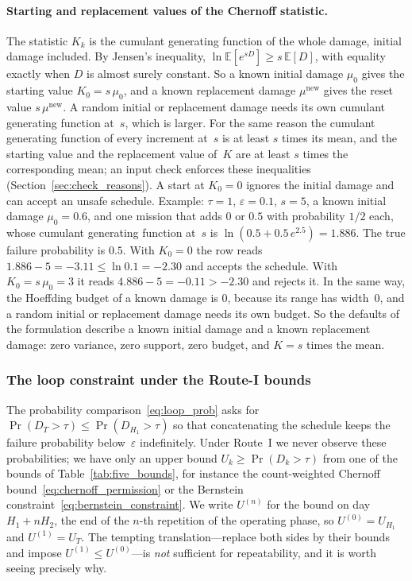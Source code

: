 \documentclass[11pt,a4paper]{article}
\theoremstyle{plain}
\theoremstyle{definition}
\theoremstyle{remark}
\begin{document}
\paragraph{Starting and replacement values of the Chernoff statistic.}
The statistic $K_k$ is the cumulant generating function of the whole damage, initial damage included.
By Jensen's inequality, $\ln\mathbb{E}[e^{sD}] \ge s\,\mathbb{E}[D]$, with equality exactly when $D$ is almost surely constant.
So a known initial damage $\mu_0$ gives the starting value $K_0 = s\,\mu_0$, and a known replacement damage $\mu^{\mathrm{new}}$ gives the reset value $s\,\mu^{\mathrm{new}}$.
A random initial or replacement damage needs its own cumulant generating function at~$s$, which is larger.
For the same reason the cumulant generating function of every increment at~$s$ is at least $s$ times its mean, and the starting value and the replacement value of~$K$ are at least $s$ times the corresponding mean; an input check enforces these inequalities (Section~\ref{sec:check_reasons}).
A start at $K_0 = 0$ ignores the initial damage and can accept an unsafe schedule.
Example: $\tau = 1$, $\varepsilon = 0.1$, $s = 5$, a known initial damage $\mu_0 = 0.6$, and one mission that adds $0$ or $0.5$ with probability $1/2$ each, whose cumulant generating function at~$s$ is $\ln(0.5 + 0.5\,e^{2.5}) = 1.886$.
The true failure probability is $0.5$.
With $K_0 = 0$ the row reads $1.886 - 5 = -3.11 \le \ln 0.1 = -2.30$ and accepts the schedule.
With $K_0 = s\,\mu_0 = 3$ it reads $4.886 - 5 = -0.11 > -2.30$ and rejects it.
In the same way, the Hoeffding budget of a known damage is $0$, because its range has width~$0$, and a random initial or replacement damage needs its own budget.
So the defaults of the formulation describe a known initial damage and a known replacement damage: zero variance, zero support, zero budget, and $K = s$ times the mean.

\subsubsection{The loop constraint under the Route-I bounds}
\label{sec:loop_routeI}

The probability comparison~\eqref{eq:loop_prob} asks for $\Pr(D_T > \tau) \le \Pr(D_{H_1} > \tau)$ so that concatenating the schedule keeps the failure probability below~$\varepsilon$ indefinitely.
Under Route~I we never observe these probabilities; we have only an upper bound $U_k \ge \Pr(D_k > \tau)$ from one of the bounds of Table~\ref{tab:five_bounds}, for instance the count-weighted Chernoff bound~\eqref{eq:chernoff_permission} or the Bernstein constraint~\eqref{eq:bernstein_constraint}.
We write $U^{(n)}$ for the bound on day $H_1 + nH_2$, the end of the $n$-th repetition of the operating phase, so $U^{(0)} = U_{H_1}$ and $U^{(1)} = U_T$.
The tempting translation---replace both sides by their bounds and impose $U^{(1)} \le U^{(0)}$---is \emph{not} sufficient for repeatability, and it is worth seeing precisely why.
\end{document}

